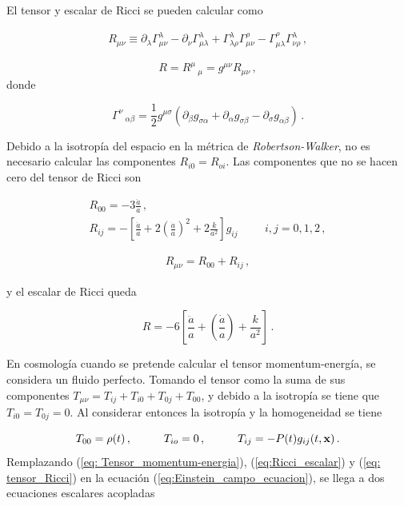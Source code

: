 El tensor y escalar de Ricci se pueden calcular como 

\begin{eqnarray}
R_{\mu\nu} \equiv \partial_{\lambda}\Gamma^{\lambda}_{\mu\nu} - \partial_{\nu}\Gamma^{\lambda}_{\mu\lambda} + \Gamma^{\lambda}_{\lambda\rho} \Gamma^{\rho}_{\mu\nu} - \Gamma^{\rho}_{\mu\lambda} \Gamma^{\lambda}_{\nu\rho}\,,
\end{eqnarray}

\begin{equation}
R=R^{\mu}\,_{\mu}=g^{\mu\nu}R_{\mu\nu}\,,
\label{eq:Tensor_Ricci}
\end{equation}
%
donde 

\begin{equation}
\Gamma^{\nu} \,_{\alpha\beta}=\frac{1}{2}g^{\mu\sigma}(\partial_{\beta} g_{\sigma\alpha}+\partial_{\alpha} g_{\sigma\beta}-\partial_{\sigma} g_{\alpha\beta})\,.
\end{equation}

Debido a la isotropía del espacio en la métrica de \textit{Robertson-Walker}, no es necesario calcular las componentes $R_{i0}=R_{oi}$. Las componentes que no se hacen cero del tensor de Ricci son


\begin{eqnarray}
R_{00}=-3\frac{\ddot{a}}{a}\,, \hspace{2cm} \\
R_{ij}=-\left[\frac{\ddot{a}}{a}+ 2\left(\frac{\dot{a}}{a}\right)^{2} + 2\frac{k}{a^{2}} \right]g_{ij} \hspace{1cm} i,j=0,1,2\,,
\end{eqnarray}

\begin{align}
R_{\mu\nu}=R_{00}+R_{ij}\,,
\label{eq: tensor_Ricci}
\end{align}

y el escalar de Ricci queda 

\begin{equation}
R=-6\left[\frac{\ddot{a}}{a} + \left(\frac{\dot{a}}{a} \right) + \frac{k}{a^{2}} \right]\,.
\label{eq:Ricci_escalar}
\end{equation}

En cosmología cuando se pretende calcular el tensor momentum-energía, se considera  un fluido perfecto. Tomando el tensor como la suma de sus componentes $T_{\mu\nu}=T_{ij}+T_{i0}+T_{0j}+T_{00}$, y debido a la isotropía se tiene que $T_{i0}=T_{0j}=0$. Al considerar entonces la isotropía y la homogeneidad se tiene

\begin{equation}
T_{00}= \rho(t)\,, \hspace{1cm} T_{io}=0\,, \hspace{1cm} T_{ij}=-P(t)g_{ij}(t,\bf{x})\,.
\label{eq: Tensor_momentum-energia}
\end{equation}
%
Remplazando (\ref{eq: Tensor_momentum-energia}), (\ref{eq:Ricci_escalar}) y (\ref{eq: tensor_Ricci}) en la ecuación (\ref{eq:Einstein_campo_ecuacion}), se llega a dos ecuaciones escalares acopladas


